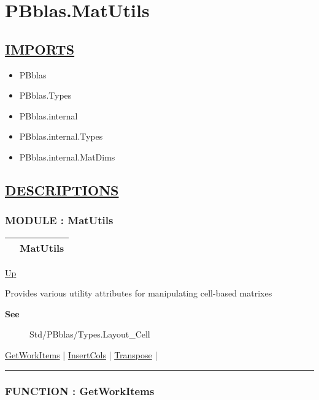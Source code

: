 \chapter*{PBblas.MatUtils}
\hypertarget{ecldoc:toc:PBblas.MatUtils}{}

\section*{\underline{IMPORTS}}
\begin{itemize}
\item PBblas
\item PBblas.Types
\item PBblas.internal
\item PBblas.internal.Types
\item PBblas.internal.MatDims
\end{itemize}

\section*{\underline{DESCRIPTIONS}}
\subsection*{MODULE : MatUtils}
\hypertarget{ecldoc:PBblas.MatUtils}{}

{\renewcommand{\arraystretch}{1.5}
\begin{tabularx}{\textwidth}{|>{\raggedright\arraybackslash}l|X|}
\hline
\hspace{0pt} & MatUtils \\
\hline
\end{tabularx}
}

\hyperlink{ecldoc:toc:PBblas}{Up}

\par
Provides various utility attributes for manipulating cell-based matrixes

\par
\begin{description}
\item [\textbf{See}] Std/PBblas/Types.Layout\_Cell
\end{description}

\hyperlink{ecldoc:pbblas.matutils.getworkitems}{GetWorkItems}  |
\hyperlink{ecldoc:pbblas.matutils.insertcols}{InsertCols}  |
\hyperlink{ecldoc:pbblas.matutils.transpose}{Transpose}  |

\rule{\textwidth}{0.4pt}

\subsection*{FUNCTION : GetWorkItems}
\hypertarget{ecldoc:pbblas.matutils.getworkitems}{}

